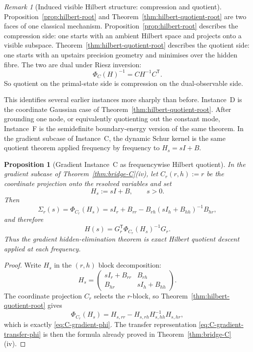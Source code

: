 \documentclass[11pt,a4paper]{article}
\numberwithin{equation}{section}
\theoremstyle{thmcompact}
\newtheorem{proposition}[theorem]{Proposition}
\theoremstyle{remark}
\newtheorem*{remarkplain}{Remark}
\newenvironment{remark}[1][]%
{\begin{remarkbox}\begin{remarkplain}[#1]\normalfont}
		{\end{remarkplain}\end{remarkbox}}
\begin{document}
\begin{remark}[Induced visible Hilbert structure: compression and quotient]\label{rem:hilbert-visible-structure}
Proposition~\ref{prop:hilbert-root} and Theorem~\ref{thm:hilbert-quotient-root} are two faces of one classical mechanism. Proposition~\ref{prop:hilbert-root} describes the compression side: one starts with an ambient Hilbert space and projects onto a visible subspace. Theorem~\ref{thm:hilbert-quotient-root} describes the quotient side: one starts with an upstairs precision geometry and minimises over the hidden fibre. The two are dual under Riesz inversion:
\begin{equation}\label{eq:hilbert-visible-dual}
\Phi_C(H)^{-1}=CH^{-1}C^{\mathsf T}.
\end{equation}
So quotient on the primal-state side is compression on the dual-observable side.

This identifies several earlier instances more sharply than before. Instance~D is the coordinate Gaussian case of Theorem~\ref{thm:hilbert-quotient-root}. After grounding one node, or equivalently quotienting out the constant mode, Instance~F is the semidefinite boundary-energy version of the same theorem. In the gradient subcase of Instance~C, the dynamic Schur kernel is the same quotient theorem applied frequency by frequency to $H_s=sI+B$.
\end{remark}

\begin{proposition}[Gradient Instance~C as frequencywise Hilbert quotient]\label{prop:C-gradient-quotient}
In the gradient subcase of Theorem~\ref{thm:bridge-C}(iv), let $C_r(r,h):=r$ be the coordinate projection onto the resolved variables and set
\begin{equation}\label{eq:C-gradient-Hs}
H_s:=sI+B, \qquad s>0.
\end{equation}
Then
\begin{equation}\label{eq:C-gradient-phi}
\Sigma_r(s)=\Phi_{C_r}(H_s)=sI_r+B_{rr}-B_{rh}(sI_h+B_{hh})^{-1}B_{hr},
\end{equation}
and therefore
\begin{equation}\label{eq:C-gradient-transfer-phi}
H(s)=G_r^{\mathsf T}\Phi_{C_r}(H_s)^{-1}G_r.
\end{equation}
Thus the gradient hidden-elimination theorem is exact Hilbert quotient descent applied at each frequency.
\end{proposition}

\begin{proof}
Write $H_s$ in the $(r,h)$ block decomposition:
\[
H_s=\begin{pmatrix}sI_r+B_{rr} & B_{rh}\\ B_{hr} & sI_h+B_{hh}\end{pmatrix}.
\]
The coordinate projection $C_r$ selects the $r$-block, so Theorem~\ref{thm:hilbert-quotient-root} gives
\[
\Phi_{C_r}(H_s)=H_{s,rr}-H_{s,rh}H_{s,hh}^{-1}H_{s,hr},
\]
which is exactly \eqref{eq:C-gradient-phi}. The transfer representation \eqref{eq:C-gradient-transfer-phi} is then the formula already proved in Theorem~\ref{thm:bridge-C}(iv).
\end{proof}
\end{document}

